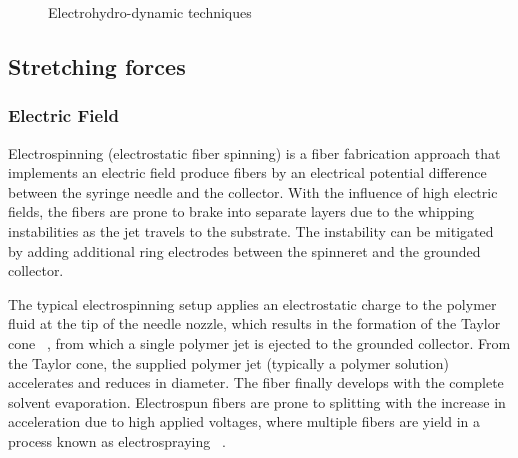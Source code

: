 \bgroup
\begin{figure}[!htbp]
\centering \makeatletter{}
\makeatother 
\caption{{Electrohydro-dynamic techniques}}
\label{f-02e0e3cf88d6}
\end{figure}
\egroup

\subsection{Stretching forces}



\subsubsection{Electric Field}Electrospinning (electrostatic fiber spinning) is a fiber fabrication approach that implements an electric field produce fibers by an electrical potential difference between the syringe needle and the collector. With the influence of high electric fields, the fibers are prone to brake into separate layers due to the whipping instabilities as the jet travels to the substrate. The instability can be mitigated by adding additional ring electrodes between the spinneret and the grounded collector. \unskip~\cite{527120:13915304}

The typical electrospinning setup applies an electrostatic charge to the polymer fluid at the tip of the needle nozzle, which results in the formation of the Taylor cone \unskip~\cite{527120:13659828}, from which a single polymer jet is ejected to the grounded collector. From the Taylor cone, the supplied polymer jet (typically a polymer solution) accelerates and reduces in diameter. The fiber finally develops with the complete solvent evaporation. Electrospun fibers are prone to splitting with the increase in acceleration due to high applied voltages, where multiple fibers are yield in a process known as electrospraying \unskip~\cite{527120:13659925}.

